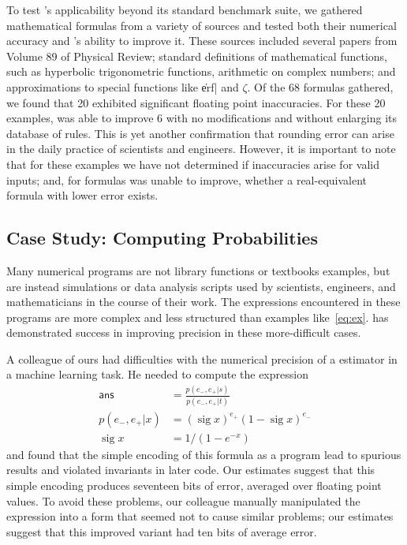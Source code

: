 \documentclass[paper.tex]{subfiles}
\begin{document}
To test \casio's applicability beyond its standard benchmark suite,
  we gathered mathematical formulas from a variety of sources
  and tested both their numerical accuracy
  and \casio's ability to improve it.
These sources included several papers from Volume 89 of Physical Review;
  standard definitions of mathematical functions,
  such as hyperbolic trigonometric functions,
  arithmetic on complex numbers;
  and approximations to special functions like \|erf| and $\zeta$.
Of the 68 formulas gathered, we found that
  20 exhibited significant floating point inaccuracies.
For these 20 examples, \casio was able to improve 6
  with no modifications and without enlarging its database of rules.
This is yet another confirmation
  that rounding error can arise in the daily practice of scientists and engineers.
However, it is important to note that for these examples
  we have not determined if inaccuracies arise for valid inputs;
  and, for formulas \casio was unable to improve,
  whether a real-equivalent formula with lower error exists.

\subsection{Case Study: Computing Probabilities}
Many numerical programs are not library functions or textbooks examples, 
  but are instead simulations or data analysis scripts
  used by scientists, engineers, and mathematicians
  in the course of their work.
The expressions encountered in these programs are more complex
  and less structured than examples like~\eqref{eq:ex}.
\casio has demonstrated success in improving precision
  in these more-difficult cases.

A colleague of ours had difficulties with the numerical precision
  of a estimator in a machine learning task.
He needed to compute the expression
\begin{align*}
\mathsf{ans} &= \frac{p(e_-,e_+|s)}{p(e_-,e_+|t)} \\
p(e_-, e_+|x) &= (\operatorname{sig} x)^{e_+} (1 - \operatorname{sig} x)^{e_-} \\
\operatorname{sig}x &= 1 / (1 - e^{-x})
\end{align*}
  and found that the simple encoding of this formula as a program
  lead to spurious results and violated invariants in later code.
Our estimates suggest that this simple encoding produces
  seventeen bits of error, averaged over floating point values.
To avoid these problems,
  our colleague manually manipulated the expression
  into a form that seemed not to cause similar problems;
  our estimates suggest that this improved variant
  had ten bits of average error.
\end{document}
